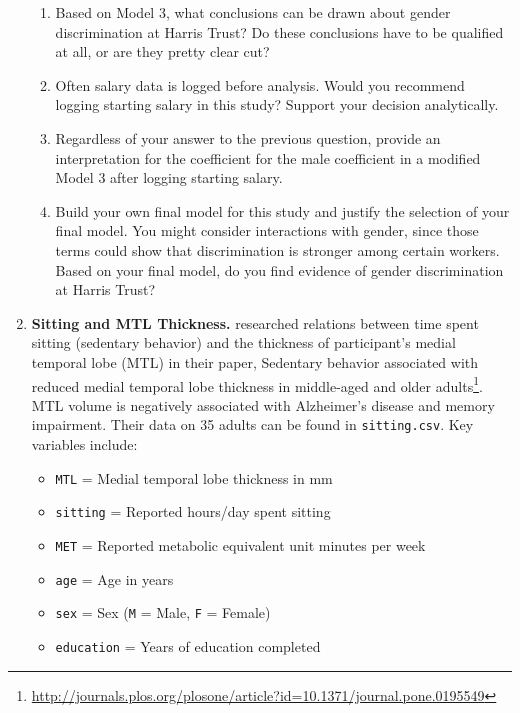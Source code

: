\documentclass[
]{krantz}
\providecommand{\tightlist}{%
  \setlength{\itemsep}{0pt}\setlength{\parskip}{0pt}}
\renewcommand{\href}[2]{#2\footnote{\url{#1}}}
\begin{document}
\begin{enumerate}
\begin{enumerate}
  \item
    Based on Model 3, what conclusions can be drawn about gender discrimination at Harris Trust? Do these conclusions have to be qualified at all, or are they pretty clear cut?
  \item
    Often salary data is logged before analysis. Would you recommend logging starting salary in this study? Support your decision analytically.
  \item
    Regardless of your answer to the previous question, provide an interpretation for the coefficient for the male coefficient in a modified Model 3 after logging starting salary.
  \item
    Build your own final model for this study and justify the selection of your final model. You might consider interactions with gender, since those terms could show that discrimination is stronger among certain workers. Based on your final model, do you find evidence of gender discrimination at Harris Trust?\\
  \end{enumerate}
\item
  \textbf{Sitting and MTL Thickness.} \citet{Siddarth2018} researched relations between time spent sitting (sedentary behavior) and the thickness of participant's medial temporal lobe (MTL) in their paper, \href{http://journals.plos.org/plosone/article?id=10.1371/journal.pone.0195549}{Sedentary behavior associated with reduced medial temporal lobe thickness in middle-aged and older adults}. MTL volume is negatively associated with Alzheimer's disease and memory impairment. Their data on 35 adults can be found in \texttt{sitting.csv}. Key variables include:

  \begin{itemize}
  \tightlist
  \item
    \texttt{MTL} = Medial temporal lobe thickness in mm
  \item
    \texttt{sitting} = Reported hours/day spent sitting
  \item
    \texttt{MET} = Reported metabolic equivalent unit minutes per week
  \item
    \texttt{age} = Age in years
  \item
    \texttt{sex} = Sex (\texttt{M} = Male, \texttt{F} = Female)
  \item
    \texttt{education} = Years of education completed
  \end{itemize}


\end{enumerate}
\end{document}
